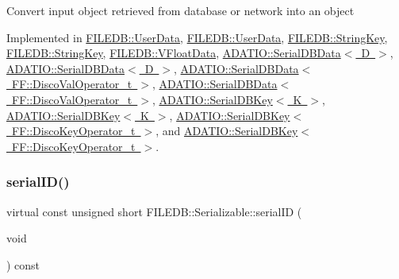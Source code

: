 Convert input object retrieved from database or network into an object 

Implemented in \mbox{\hyperlink{classFILEDB_1_1UserData_a61ccded861bac4b772af2488a2cc7605}{F\+I\+L\+E\+D\+B\+::\+User\+Data}}, \mbox{\hyperlink{classFILEDB_1_1UserData_a61ccded861bac4b772af2488a2cc7605}{F\+I\+L\+E\+D\+B\+::\+User\+Data}}, \mbox{\hyperlink{classFILEDB_1_1StringKey_a25cefb184c88bc5bf871245e82ea21f9}{F\+I\+L\+E\+D\+B\+::\+String\+Key}}, \mbox{\hyperlink{classFILEDB_1_1StringKey_a25cefb184c88bc5bf871245e82ea21f9}{F\+I\+L\+E\+D\+B\+::\+String\+Key}}, \mbox{\hyperlink{classFILEDB_1_1VFloatData_ae217975cba234df3601c065669f26f38}{F\+I\+L\+E\+D\+B\+::\+V\+Float\+Data}}, \mbox{\hyperlink{classADATIO_1_1SerialDBData_a2f7405b96f413b1787fc2072b8932c20}{A\+D\+A\+T\+I\+O\+::\+Serial\+D\+B\+Data$<$ D $>$}}, \mbox{\hyperlink{classADATIO_1_1SerialDBData_a2f7405b96f413b1787fc2072b8932c20}{A\+D\+A\+T\+I\+O\+::\+Serial\+D\+B\+Data$<$ D $>$}}, \mbox{\hyperlink{classADATIO_1_1SerialDBData_a2f7405b96f413b1787fc2072b8932c20}{A\+D\+A\+T\+I\+O\+::\+Serial\+D\+B\+Data$<$ F\+F\+::\+Disco\+Val\+Operator\+\_\+t $>$}}, \mbox{\hyperlink{classADATIO_1_1SerialDBData_a2f7405b96f413b1787fc2072b8932c20}{A\+D\+A\+T\+I\+O\+::\+Serial\+D\+B\+Data$<$ F\+F\+::\+Disco\+Val\+Operator\+\_\+t $>$}}, \mbox{\hyperlink{classADATIO_1_1SerialDBKey_a10b5c24f2529bac1df4c4603c2caf551}{A\+D\+A\+T\+I\+O\+::\+Serial\+D\+B\+Key$<$ K $>$}}, \mbox{\hyperlink{classADATIO_1_1SerialDBKey_a10b5c24f2529bac1df4c4603c2caf551}{A\+D\+A\+T\+I\+O\+::\+Serial\+D\+B\+Key$<$ K $>$}}, \mbox{\hyperlink{classADATIO_1_1SerialDBKey_a10b5c24f2529bac1df4c4603c2caf551}{A\+D\+A\+T\+I\+O\+::\+Serial\+D\+B\+Key$<$ F\+F\+::\+Disco\+Key\+Operator\+\_\+t $>$}}, and \mbox{\hyperlink{classADATIO_1_1SerialDBKey_a10b5c24f2529bac1df4c4603c2caf551}{A\+D\+A\+T\+I\+O\+::\+Serial\+D\+B\+Key$<$ F\+F\+::\+Disco\+Key\+Operator\+\_\+t $>$}}.

\mbox{\label{classFILEDB_1_1Serializable_a5d639b5dbd5d8ebc7dca1eca31bbc868}} 
\subsubsection{\texorpdfstring{serialID()}{serialID()}\hspace{0.1cm}{\footnotesize\ttfamily [1/2]}}
{\footnotesize\ttfamily virtual const unsigned short F\+I\+L\+E\+D\+B\+::\+Serializable\+::serial\+ID (\begin{DoxyParamCaption}\item[{void}]{ }\end{DoxyParamCaption}) const\hspace{0.3cm}{\ttfamily [pure virtual]}}


